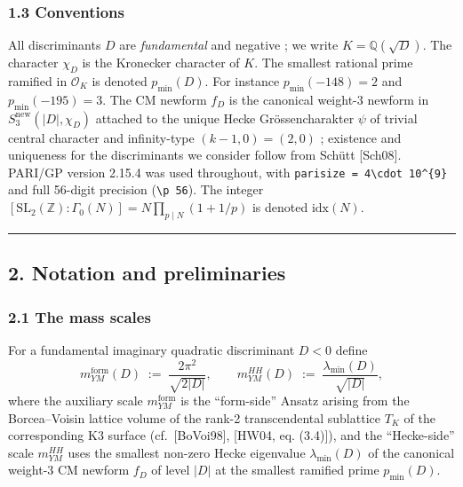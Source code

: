 \documentclass[
  11pt,
  a4paper,
]{amsart}
\begin{document}
\hypertarget{conventions}{%
\subsubsection{1.3 Conventions}\label{conventions}}

All discriminants \(D\) are \emph{fundamental} and negative ; we write \(K = \mathbb{Q}(\sqrt{D})\). The character \(\chi_D\) is the Kronecker character of \(K\). The smallest rational prime ramified in \(\mathcal{O}_K\) is denoted \(p_{\min}(D)\). For instance \(p_{\min}(-148) = 2\) and \(p_{\min}(-195) = 3\). The CM newform \(f_D\) is the canonical weight-3 newform in \(S_{3}^{\mathrm{new}}(|D|, \chi_D)\) attached to the unique Hecke Grössencharakter \(\psi\) of trivial central character and infinity-type \((k-1, 0) = (2, 0)\) ; existence and uniqueness for the discriminants we consider follow from Schütt {[}Sch08{]}. PARI/GP version 2.15.4 was used throughout, with \texttt{parisize\ =\ 4\textbackslash{}cdot\ 10\^{}\{9\}} and full 56-digit precision (\texttt{\textbackslash{}p\ 56}). The integer \([\mathrm{SL}_2(\mathbb{Z}) : \Gamma_0(N)] = N\prod_{p\mid N}(1+ 1/p)\) is denoted \(\mathrm{idx}(N)\).

\begin{center}\rule{0.5\linewidth}{0.5pt}\end{center}

\hypertarget{notation-and-preliminaries}{%
\subsection{2. Notation and preliminaries}\label{notation-and-preliminaries}}

\hypertarget{the-mass-scales}{%
\subsubsection{2.1 The mass scales}\label{the-mass-scales}}

For a fundamental imaginary quadratic discriminant \(D<0\) define
\[
m_{YM}^{\mathrm{form}}(D) \;:=\; \frac{2\pi^{2}}{\sqrt{2|D|}}, \qquad m_{YM}^{HH}(D) \;:=\; \frac{\lambda_{\min}(D)}{\sqrt{|D|}},
\]
where the auxiliary scale \(m_{YM}^{\mathrm{form}}\) is the ``form-side'' Ansatz arising from the Borcea--Voisin lattice volume of the rank-2 transcendental sublattice \(T_K\) of the corresponding K3 surface (cf.~{[}BoVoi98{]}, {[}HW04, eq. (3.4){]}), and the ``Hecke-side'' scale \(m_{YM}^{HH}\) uses the smallest non-zero Hecke eigenvalue \(\lambda_{\min}(D)\) of the canonical weight-3 CM newform \(f_D\) of level \(|D|\) at the smallest ramified prime \(p_{\min}(D)\).
\end{document}
